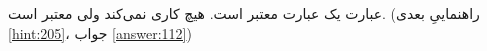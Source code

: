 \section{}
\paragraph{}\label{hint:38}
عبارت  یک عبارت معتبر  است. هیچ کاری نمی‌کند ولی معتبر است. (راهنماییِ بعدی \ref{hint:205}، جواب \ref{answer:112})